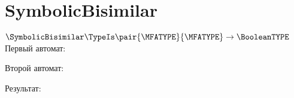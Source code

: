 \section{SymbolicBisimilar}
\begin{frame}{$\SymbolicBisimilar\TypeIs\pair{\MFATYPE}{\MFATYPE}\to\BooleanTYPE$}
	Первый автомат:

	Второй автомат:

	Результат:

\end{frame}